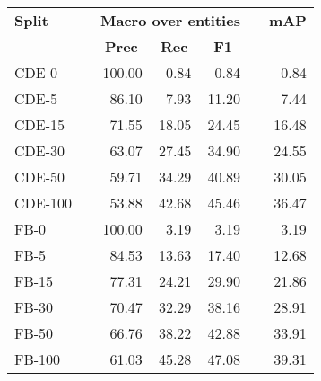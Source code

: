 \begin{tabular}{ l c r r r c r }
    \toprule

    \multicolumn{1}{l}{\textbf{Split}} & \phantom &
    \multicolumn{3}{c}{\textbf{Macro over entities}} & \phantom &
    \multicolumn{1}{c}{\textbf{mAP}} \\

    \cmidrule{3-5}


    \multicolumn{1}{c}{} &&
    \multicolumn{1}{c}{\textbf{Prec}} &
    \multicolumn{1}{c}{\textbf{Rec}} &
    \multicolumn{1}{c}{\textbf{F1}} &&
    \multicolumn{1}{c}{} \\

    \midrule

    CDE-0   && 100.00 &  0.84 &  0.84 &&  0.84 \\
    CDE-5   &&  86.10 &  7.93 & 11.20 &&  7.44 \\
    CDE-15  &&  71.55 & 18.05 & 24.45 && 16.48 \\
    CDE-30  &&  63.07 & 27.45 & 34.90 && 24.55 \\
    CDE-50  &&  59.71 & 34.29 & 40.89 && 30.05 \\
    CDE-100 &&  53.88 & 42.68 & 45.46 && 36.47 \\

    \addlinespace

    FB-0    && 100.00 &  3.19 &  3.19 &&  3.19 \\
    FB-5    &&  84.53 & 13.63 & 17.40 && 12.68 \\
    FB-15   &&  77.31 & 24.21 & 29.90 && 21.86 \\
    FB-30   &&  70.47 & 32.29 & 38.16 && 28.91 \\
    FB-50   &&  66.76 & 38.22 & 42.88 && 33.91 \\
    FB-100  &&  61.03 & 45.28 & 47.08 && 39.31 \\

    \bottomrule
\end{tabular}
